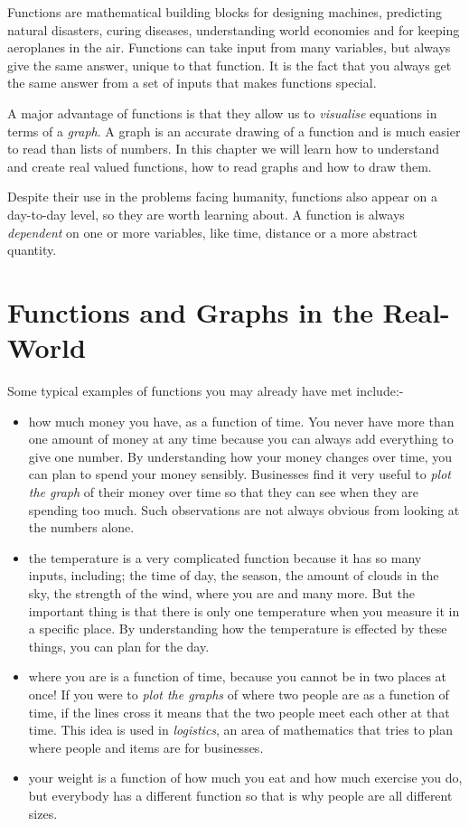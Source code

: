 \documentclass[10pt,a4paper,titlepage,twoside,openright]{report}
\begin{document}
Functions are mathematical building blocks for designing machines, predicting natural disasters, curing diseases, understanding world economies and for keeping aeroplanes in the air. Functions can take input from many variables, but always give the same answer, unique to that function. It is the fact that you always get the same answer from a set of inputs that makes functions special.

A major advantage of functions is that they allow us to \textit{visualise} equations in terms of a \textit{graph}. A graph is an accurate drawing of a function and is much easier to read than lists of numbers. In this chapter we will learn how to understand and create real valued functions, how to read graphs and how to draw them.

Despite their use in the problems facing humanity, functions also appear on a day-to-day level, so they are worth learning about. A function is always \textit{dependent} on one or more variables, like time, distance or a more abstract quantity.

\section{Functions and Graphs in the Real-World}
\label{mf:realworld}

Some typical examples of functions you may already have met
include:-
\begin{itemize}
\item how much money you have, as a function of time. You never have more than one amount of money at any time because you can always add everything to give one number. By understanding how your money changes over time, you can plan to spend your money sensibly. Businesses find it very useful to \textit{plot the graph} of their money over time so that they can see when they are spending too much. Such observations are not always obvious from looking at the numbers alone.
\item the temperature is a very complicated function because it has so many inputs, including; the time of day, the season, the amount of clouds in the sky, the strength of the wind, where you are and many more. But the important thing is that there is only one temperature when you measure it in a specific place. By understanding how the temperature is effected by these things, you can plan
for the day.
\item where you are is a function of time, because you cannot be in two places at once! If you were to \textit{plot the graphs} of where two people are as a function of time, if the lines cross it means that the two people meet each other at that time. This idea is used in \textit{logistics}, an area of mathematics that tries to plan where people and items are for businesses.
\item your weight is a function of how much you eat and how much exercise you do, but everybody has a different function so that is why people are all different sizes.
\end{itemize}
\end{document}
